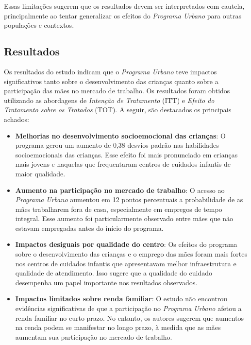 \documentclass[a4paper,12pt]{article}[abntex2]
\begin{document}
Essas limitações sugerem que os resultados devem ser interpretados com cautela, principalmente ao tentar generalizar os efeitos do \textit{Programa Urbano} para outras populações e contextos.
\subsection{\textbf{Resultados}}

Os resultados do estudo indicam que o \textit{Programa Urbano} teve impactos significativos tanto sobre o desenvolvimento das crianças quanto sobre a participação das mães no mercado de trabalho. Os resultados foram obtidos utilizando as abordagens de \textit{Intenção de Tratamento} (ITT) e \textit{Efeito do Tratamento sobre os Tratados} (TOT). A seguir, são destacados os principais achados:

\begin{itemize}
    \item \textbf{Melhorias no desenvolvimento socioemocional das crianças}: O programa gerou um aumento de 0,38 desvios-padrão nas habilidades socioemocionais das crianças. Esse efeito foi mais pronunciado em crianças mais jovens e naquelas que frequentaram centros de cuidados infantis de maior qualidade.
    
    \item \textbf{Aumento na participação no mercado de trabalho}: O acesso ao \textit{Programa Urbano} aumentou em 12 pontos percentuais a probabilidade de as mães trabalharem fora de casa, especialmente em empregos de tempo integral. Esse aumento foi particularmente observado entre mães que não estavam empregadas antes do início do programa.
    
    \item \textbf{Impactos desiguais por qualidade do centro}: Os efeitos do programa sobre o desenvolvimento das crianças e o emprego das mães foram mais fortes nos centros de cuidados infantis que apresentavam melhor infraestrutura e qualidade de atendimento. Isso sugere que a qualidade do cuidado desempenha um papel importante nos resultados observados.
    
    \item \textbf{Impactos limitados sobre renda familiar}: O estudo não encontrou evidências significativas de que a participação no \textit{Programa Urbano} afetou a renda familiar no curto prazo. No entanto, os autores sugerem que aumentos na renda podem se manifestar no longo prazo, à medida que as mães aumentam sua participação no mercado de trabalho.
    

\end{itemize}
\end{document}
